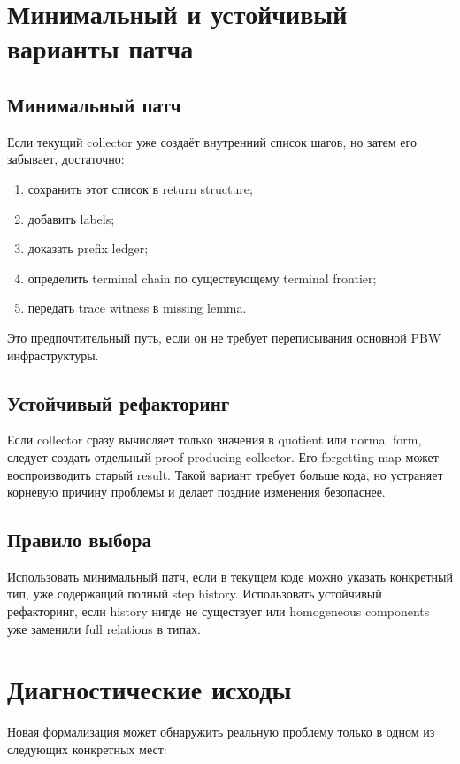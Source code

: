 \documentclass[11pt,a4paper]{article}
\theoremstyle{definition}
\theoremstyle{remark}
\begin{document}
\section{Минимальный и устойчивый варианты патча}

\subsection{Минимальный патч}

Если текущий collector уже создаёт внутренний список шагов, но затем его
забывает, достаточно:
\begin{enumerate}
\item сохранить этот список в return structure;
\item добавить labels;
\item доказать prefix ledger;
\item определить terminal chain по существующему terminal frontier;
\item передать trace witness в missing lemma.
\end{enumerate}
Это предпочтительный путь, если он не требует переписывания основной PBW
инфраструктуры.

\subsection{Устойчивый рефакторинг}

Если collector сразу вычисляет только значения в quotient или normal form,
следует создать отдельный proof-producing collector. Его forgetting map может
воспроизводить старый result. Такой вариант требует больше кода, но устраняет
корневую причину проблемы и делает поздние изменения безопаснее.

\subsection{Правило выбора}

Использовать минимальный патч, если в текущем коде можно указать конкретный
тип, уже содержащий полный step history. Использовать устойчивый рефакторинг,
если history нигде не существует или homogeneous components уже заменили
full relations в типах.

\section{Диагностические исходы}

Новая формализация может обнаружить реальную проблему только в одном из
следующих конкретных мест:
\end{document}

